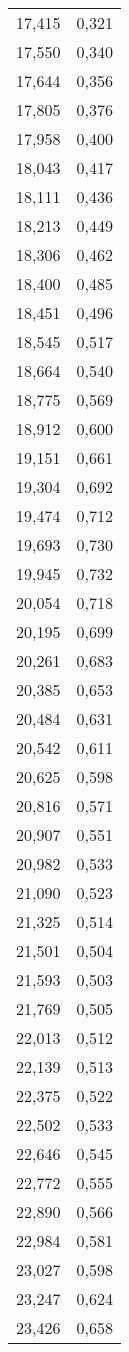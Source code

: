 \begin{longtable}{c c}
	17,415&0,321 \\
	17,550&0,340 \\
	17,644&0,356 \\
	17,805&0,376 \\
	17,958&0,400 \\
	18,043&0,417 \\
	18,111&0,436 \\
	18,213&0,449 \\
	18,306&0,462 \\
	18,400&0,485 \\
	18,451&0,496 \\
	18,545&0,517 \\
	18,664&0,540 \\
	18,775&0,569 \\
	18,912&0,600 \\
	19,151&0,661 \\
	19,304&0,692 \\
	19,474&0,712 \\
	19,693&0,730 \\
	19,945&0,732 \\
	20,054&0,718 \\
	20,195&0,699 \\
	20,261&0,683 \\
	20,385&0,653 \\
	20,484&0,631 \\
	20,542&0,611 \\
	20,625&0,598 \\
	20,816&0,571 \\
	20,907&0,551 \\
	20,982&0,533 \\
	21,090&0,523 \\
	21,325&0,514 \\
	21,501&0,504 \\
	21,593&0,503 \\
	21,769&0,505 \\
	22,013&0,512 \\
	22,139&0,513 \\
	22,375&0,522 \\
	22,502&0,533 \\
	22,646&0,545 \\
	22,772&0,555 \\
	22,890&0,566 \\
	22,984&0,581 \\
	23,027&0,598 \\
	23,247&0,624 \\
	23,426&0,658 \\

\end{longtable}
